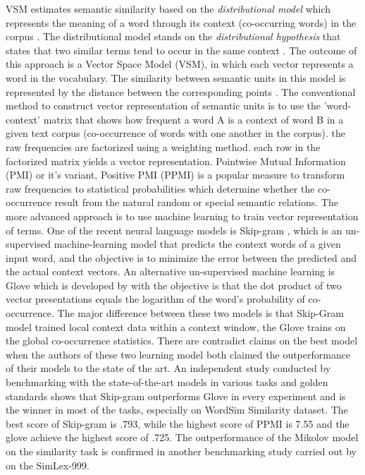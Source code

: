\documentclass[Journal,InsideFigs, DoubleSpace]{ascelike} %
\begin{document}
VSM estimates semantic similarity based on the \textit{distributional model} which represents the meaning of a word through its context (co-occurring words) in the corpus \cite{erk12}. The distributional model stands on the \textit{distributional hypothesis} that states that two similar terms tend to occur in the same context \cite{Harris54}. The outcome of this approach is a Vector Space Model (VSM), in which each vector represents a word in the vocabulary. The similarity between semantic units in this model is represented by the distance between the corresponding points \cite{erk12}. The conventional method to construct vector representation of semantic units is to use the 'word-context' matrix that shows how frequent a word A is a context of word B in a given text corpus (co-occurrence of words with one another in the corpus). the raw frequencies are factorized using a weighting method. each row in the factorized matrix yields a vector representation. Pointwise Mutual Information (PMI) \cite{church90} or it's variant, Positive PMI (PPMI) is a popular measure to transform raw frequencies to statistical probabilities which determine whether the co-occurrence result from the natural random or special semantic relations. The more advanced approach is to use machine learning to train vector representation of terms. One of the recent neural language models is Skip-gram \cite{mikolov13a}, which is an un-supervised machine-learning model that predicts the context words of a given input word, and the objective  is to minimize the error between the predicted and the actual context vectors. An alternative un-supervised machine learning is Glove which is developed by \cite{pennington2014glove} with the objective is that the dot product of two vector presentations equals the logarithm of the word's probability of co-occurrence. The major difference between these two models is that Skip-Gram model trained local context data within a context window, the Glove trains on the global co-occurrence statistics. There are contradict claims on the best model when the authors of these two learning model both claimed the outperformance of their models to the state of the art. An independent study conducted by \cite{levy15} benchmarking with the state-of-the-art models in various tasks and golden standards shows that Skip-gram outperforms Glove in every experiment and is the winner in most of the tasks, especially on WordSim Similarity dataset. The best score of Skip-gram is .793, while the highest score of PPMI is 7.55 and the glove achieve the highest score of .725.  The outperformance of the Mikolov model on the similarity task is confirmed in another benchmarking study carried out by \cite{hill15}  on the SimLex-999. 
\end{document}
